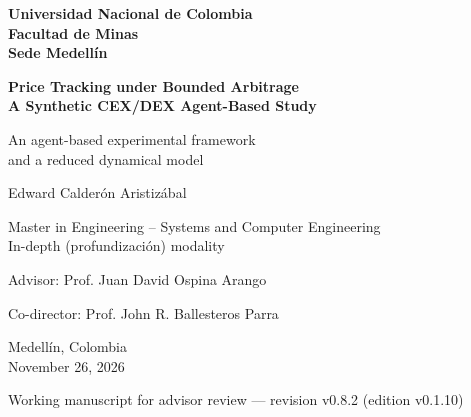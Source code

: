 \documentclass[11pt,letterpaper]{report}
\newcommand{\versionTesis}{v0.1.10}
\newcommand{\revisionManuscrito}{v0.8.2}
\numberwithin{equation}{chapter}
\begin{document}
\begin{titlepage}
  \thispagestyle{empty}
  \centering
  \singlespacing
  {\large\bfseries Universidad Nacional de Colombia\\[2pt]
  Facultad de Minas\\[2pt]
  Sede Medellín\par}
  \vspace{3.2cm}
  {\LARGE\bfseries Price Tracking under Bounded Arbitrage\\
  A Synthetic CEX/DEX Agent-Based Study\par}
  \vspace{0.9cm}
  {\Large An agent-based experimental framework\\
  and a reduced dynamical model\par}
  \vspace{2.6cm}
  {\Large Edward Calderón Aristizábal\par}
  \vspace{1.6cm}
  {\large Master in Engineering -- Systems and Computer Engineering\\[2pt]
  In-depth (profundización) modality\par}
  \vspace{0.8cm}
  {\large Advisor: Prof. Juan David Ospina Arango\par}
  {\large Co-director: Prof. John R. Ballesteros Parra\par}
  \vfill
  {\large Medellín, Colombia\\[2pt]
  November 26, 2026\par}
  \vspace{0.3cm}
  {\small Working manuscript for advisor review --- revision \revisionManuscrito{} (edition \versionTesis{})\par}
\end{titlepage}

\setcounter{page}{1}

\begingroup
\setcounter{secnumdepth}{-1}
\titleformat{\section}{\Large\bfseries}{}{0pt}{}
\singlespacing

\clearpage

\endgroup
\setcounter{secnumdepth}{2}
\end{document}
